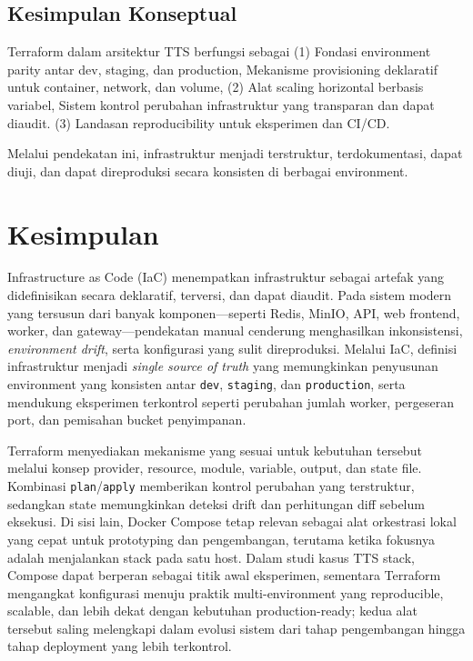 \subsection*{Kesimpulan Konseptual}

Terraform dalam arsitektur TTS berfungsi sebagai (1) Fondasi environment parity antar dev, staging, dan production,  
Mekanisme provisioning deklaratif untuk container, network, dan volume,  
(2) Alat scaling horizontal berbasis variabel,  
Sistem kontrol perubahan infrastruktur yang transparan dan dapat diaudit. (3) Landasan reproducibility untuk eksperimen dan CI/CD.  

Melalui pendekatan ini, infrastruktur menjadi terstruktur, terdokumentasi, dapat diuji, dan dapat direproduksi secara konsisten di berbagai environment.


\section{Kesimpulan}

Infrastructure as Code (IaC) menempatkan infrastruktur sebagai artefak yang didefinisikan secara deklaratif, terversi, dan dapat diaudit. Pada sistem modern yang tersusun dari banyak komponen—seperti Redis, MinIO, API, web frontend, worker, dan gateway—pendekatan manual cenderung menghasilkan inkonsistensi, \textit{environment drift}, serta konfigurasi yang sulit direproduksi. Melalui IaC, definisi infrastruktur menjadi \textit{single source of truth} yang memungkinkan penyusunan environment yang konsisten antar \texttt{dev}, \texttt{staging}, dan \texttt{production}, serta mendukung eksperimen terkontrol seperti perubahan jumlah worker, pergeseran port, dan pemisahan bucket penyimpanan.

Terraform menyediakan mekanisme yang sesuai untuk kebutuhan tersebut melalui konsep provider, resource, module, variable, output, dan state file. Kombinasi \texttt{plan}/\texttt{apply} memberikan kontrol perubahan yang terstruktur, sedangkan state memungkinkan deteksi drift dan perhitungan diff sebelum eksekusi. Di sisi lain, Docker Compose tetap relevan sebagai alat orkestrasi lokal yang cepat untuk prototyping dan pengembangan, terutama ketika fokusnya adalah menjalankan stack pada satu host. Dalam studi kasus TTS stack, Compose dapat berperan sebagai titik awal eksperimen, sementara Terraform mengangkat konfigurasi menuju praktik multi-environment yang reproducible, scalable, dan lebih dekat dengan kebutuhan production-ready; kedua alat tersebut saling melengkapi dalam evolusi sistem dari tahap pengembangan hingga tahap deployment yang lebih terkontrol.

